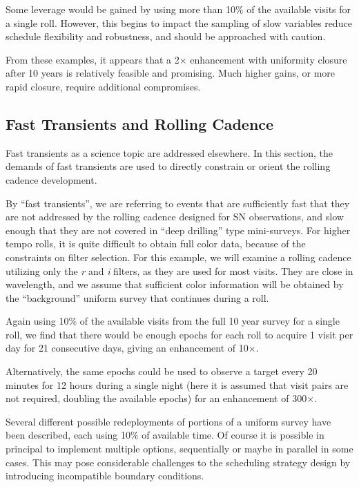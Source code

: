 Some leverage would be gained by using more than 10\% of the available visits for a single roll.  However, this begins to impact the sampling of slow variables reduce schedule flexibility and robustness, and should be approached with caution.

From these examples, it appears that a 2$\times$ enhancement with uniformity closure after 10 years is relatively feasible and promising.  Much higher gains, or more rapid closure, require additional compromises.


\subsection{ Fast Transients and Rolling Cadence}
\label{sec:rolling:transients}


Fast transients as a science topic are addressed elsewhere. In this section, the demands of fast transients are used to directly constrain or
orient the rolling cadence development.

By ``fast transients'', we are referring to events that are sufficiently fast that they are not addressed by the rolling cadence designed for SN observations, and slow enough that they are not covered in ``deep drilling'' type mini-surveys.  For higher tempo rolls, it is quite difficult to obtain full color data, because of the constraints on filter selection.  For this example, we will examine a rolling cadence utilizing only the {\it r} and {\it i} filters, as they are used for most visits. They are close in wavelength, and we assume that sufficient color information will be obtained by the ``background'' uniform survey that continues during a roll.

Again using 10\% of the available visits from the full 10 year survey for a single roll, we find that there would be enough epochs for each roll to acquire 1 visit per day for 21 consecutive days, giving an enhancement of 10$\times$.  

Alternatively, the same epochs could be used to observe a target every 20 minutes for 12 hours during a single night (here it is assumed that visit pairs are not required, doubling the available epochs) for an enhancement of 300$\times$.

Several different possible redeployments of portions of a uniform survey have been described, each using 10\% of available time.  Of course it is possible in principal to implement multiple options, sequentially or maybe in parallel in some cases. This may pose considerable challenges to the scheduling strategy design by introducing incompatible boundary conditions.

